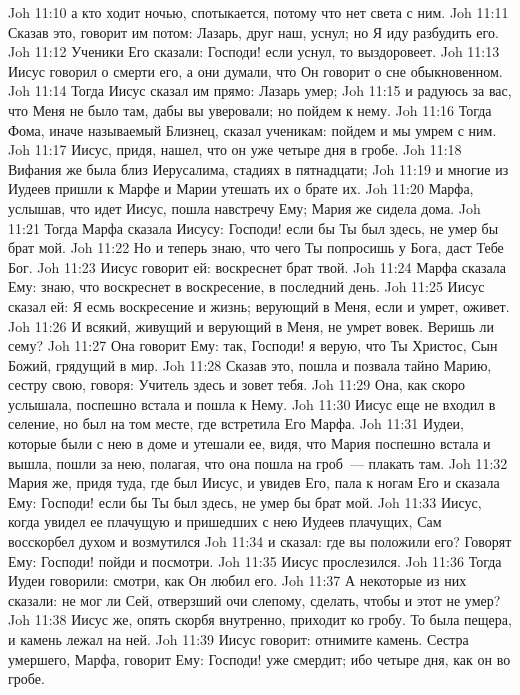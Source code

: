 \vs Joh 11:10 а кто ходит ночью, спотыкается, потому что нет света с ним.
\vs Joh 11:11 Сказав это, говорит им потом: Лазарь, друг наш, уснул; но Я иду разбудить его.
\vs Joh 11:12 Ученики Его сказали: Господи! если уснул, то выздоровеет.
\vs Joh 11:13 Иисус говорил о смерти его, а они думали, что Он говорит о сне обыкновенном.
\vs Joh 11:14 Тогда Иисус сказал им прямо: Лазарь умер;
\vs Joh 11:15 и радуюсь за вас, что Меня не было там, дабы вы уверовали; но пойдем к нему.
\vs Joh 11:16 Тогда Фома, иначе называемый Близнец, сказал ученикам: пойдем и мы умрем с ним.
\vs Joh 11:17 Иисус, придя, нашел, что он уже четыре дня в гробе.
\vs Joh 11:18 Вифания же была близ Иерусалима, стадиях в пятнадцати;
\vs Joh 11:19 и многие из Иудеев пришли к Марфе и Марии утешать их  о брате их.
\vs Joh 11:20 Марфа, услышав, что идет Иисус, пошла навстречу Ему; Мария же сидела дома.
\vs Joh 11:21 Тогда Марфа сказала Иисусу: Господи! если бы Ты был здесь, не умер бы брат мой.
\vs Joh 11:22 Но и теперь знаю, что чего Ты попросишь у Бога, даст Тебе Бог.
\vs Joh 11:23 Иисус говорит ей: воскреснет брат твой.
\vs Joh 11:24 Марфа сказала Ему: знаю, что воскреснет в воскресение, в последний день.
\vs Joh 11:25 Иисус сказал ей: Я есмь воскресение и жизнь; верующий в Меня, если и умрет, оживет.
\vs Joh 11:26 И всякий, живущий и верующий в Меня, не умрет вовек. Веришь ли сему?
\vs Joh 11:27 Она говорит Ему: так, Господи! я верую, что Ты Христос, Сын Божий, грядущий в мир.
\vs Joh 11:28 Сказав это, пошла и позвала тайно Марию, сестру свою, говоря: Учитель здесь и зовет тебя.
\vs Joh 11:29 Она, как скоро услышала, поспешно встала и пошла к Нему.
\vs Joh 11:30 Иисус еще не входил в селение, но был на том месте, где встретила Его Марфа.
\vs Joh 11:31 Иудеи, которые были с нею в доме и утешали ее, видя, что Мария поспешно встала и вышла, пошли за нею, полагая, что она пошла на гроб~--- плакать там.
\vs Joh 11:32 Мария же, придя туда, где был Иисус, и увидев Его, пала к ногам Его и сказала Ему: Господи! если бы Ты был здесь, не умер бы брат мой.
\vs Joh 11:33 Иисус, когда увидел ее плачущую и пришедших с нею Иудеев плачущих, Сам восскорбел духом и возмутился
\vs Joh 11:34 и сказал: где вы положили его? Говорят Ему: Господи! пойди и посмотри.
\vs Joh 11:35 Иисус прослезился.
\vs Joh 11:36 Тогда Иудеи говорили: смотри, как Он любил его.
\vs Joh 11:37 А некоторые из них сказали: не мог ли Сей, отверзший очи слепому, сделать, чтобы и этот не умер?
\vs Joh 11:38 Иисус же, опять скорбя внутренно, приходит ко гробу. То была пещера, и камень лежал на ней.
\vs Joh 11:39 Иисус говорит: отнимите камень. Сестра умершего, Марфа, говорит Ему: Господи! уже смердит; ибо четыре дня, как он во гробе.
